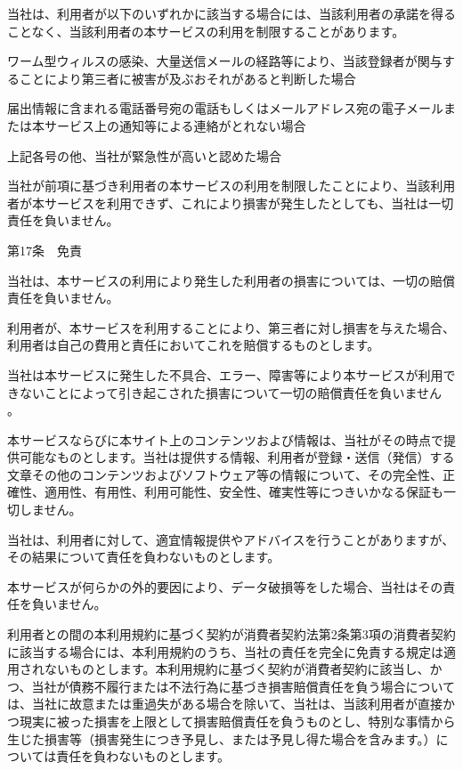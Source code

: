     当社は、利用者が以下のいずれかに該当する場合には、当該利用者の承諾を得ることなく、当該利用者の本サービスの利用を制限することがあります。

        ワーム型ウィルスの感染、大量送信メールの経路等により、当該登録者が関与することにより第三者に被害が及ぶおそれがあると判断した場合

        届出情報に含まれる電話番号宛の電話もしくはメールアドレス宛の電子メールまたは本サービス上の通知等による連絡がとれない場合

        上記各号の他、当社が緊急性が高いと認めた場合

    当社が前項に基づき利用者の本サービスの利用を制限したことにより、当該利用者が本サービスを利用できず、これにより損害が発生したとしても、当社は一切責任を負いません。

第17条　免責

    当社は、本サービスの利用により発生した利用者の損害については、一切の賠償責任を負いません。

    利用者が、本サービスを利用することにより、第三者に対し損害を与えた場合、利用者は自己の費用と責任においてこれを賠償するものとします。

    当社は本サービスに発生した不具合、エラー、障害等により本サービスが利用できないことによって引き起こされた損害について一切の賠償責任を負いません 。

    本サービスならびに本サイト上のコンテンツおよび情報は、当社がその時点で提供可能なものとします。当社は提供する情報、利用者が登録・送信（発信）する文章その他のコンテンツおよびソフトウェア等の情報について、その完全性、正確性、適用性、有用性、利用可能性、安全性、確実性等につきいかなる保証も一切しません。

    当社は、利用者に対して、適宜情報提供やアドバイスを行うことがありますが、その結果について責任を負わないものとします。

    本サービスが何らかの外的要因により、データ破損等をした場合、当社はその責任を負いません。

    利用者との間の本利用規約に基づく契約が消費者契約法第2条第3項の消費者契約に該当する場合には、本利用規約のうち、当社の責任を完全に免責する規定は適用されないものとします。本利用規約に基づく契約が消費者契約に該当し、かつ、当社が債務不履行または不法行為に基づき損害賠償責任を負う場合については、当社に故意または重過失がある場合を除いて、当社は、当該利用者が直接かつ現実に被った損害を上限として損害賠償責任を負うものとし、特別な事情から生じた損害等（損害発生につき予見し、または予見し得た場合を含みます。）については責任を負わないものとします。

